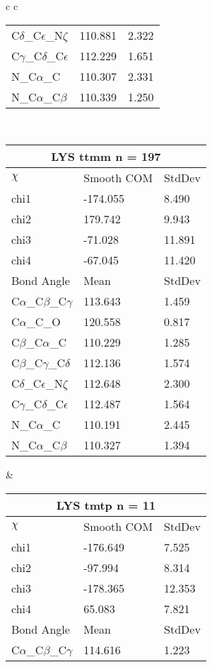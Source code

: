 \begin{longtable}{ c c }
\begin{tabular}{ l l l }
  C$\delta$\_C$\epsilon$\_N$\zeta$ & 110.881 & 2.322\\
  C$\gamma$\_C$\delta$\_C$\epsilon$ & 112.229 & 1.651\\
  N\_C$\alpha$\_C & 110.307 & 2.331\\
  N\_C$\alpha$\_C$\beta$ & 110.339 & 1.250\\
  \bottomrule
  \end{tabular}
  \\
  \begin{tabular}{ l l l }
  \toprule
  \multicolumn{3}{c}{LYS \textbf{ttmm} n = 197} \\ \toprule
  $\chi$       & Smooth COM & StdDev \\ \midrule
  chi1 & -174.055 & 8.490 \\ 
  chi2 & 179.742 & 9.943 \\ 
  chi3 & -71.028 & 11.891 \\ 
  chi4 & -67.045 & 11.420 \\ \midrule
  Bond Angle   & Mean     & StdDev \\ \midrule
  C$\alpha$\_C$\beta$\_C$\gamma$ & 113.643 & 1.459\\
  C$\alpha$\_C\_O & 120.558 & 0.817\\
  C$\beta$\_C$\alpha$\_C & 110.229 & 1.285\\
  C$\beta$\_C$\gamma$\_C$\delta$ & 112.136 & 1.574\\
  C$\delta$\_C$\epsilon$\_N$\zeta$ & 112.648 & 2.300\\
  C$\gamma$\_C$\delta$\_C$\epsilon$ & 112.487 & 1.564\\
  N\_C$\alpha$\_C & 110.191 & 2.445\\
  N\_C$\alpha$\_C$\beta$ & 110.327 & 1.394\\
  \bottomrule
  \end{tabular}
  &
  \begin{tabular}{ l l l }
  \toprule
  \multicolumn{3}{c}{LYS \textbf{tmtp} n = 11} \\ \toprule
  $\chi$       & Smooth COM & StdDev \\ \midrule
  chi1 & -176.649 & 7.525 \\ 
  chi2 & -97.994 & 8.314 \\ 
  chi3 & -178.365 & 12.353 \\ 
  chi4 & 65.083 & 7.821 \\ \midrule
  Bond Angle   & Mean     & StdDev \\ \midrule
  C$\alpha$\_C$\beta$\_C$\gamma$ & 114.616 & 1.223\\

\end{tabular}
\end{longtable}

